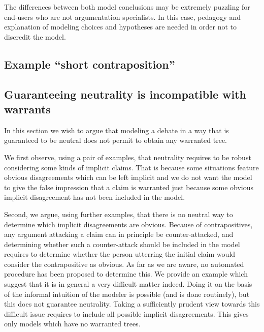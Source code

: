 \documentclass[version=3.21, pagesize, twoside=off, bibliography=totoc, DIV=calc, fontsize=12pt, a4paper, french, english]{scrartcl}
\begin{document}
The differences between both model conclusions may be extremely puzzling for end-users who are not argumentation specialists. In this case, pedagogy and explanation of modeling choices and hypotheses are needed in order not to discredit the model.

\subsection{Example “short contraposition”}

\subsection{Guaranteeing neutrality is incompatible with warrants}
In this section we wish to argue that modeling a debate in a way that is guaranteed to be neutral does not permit to obtain any warranted tree. 

We first observe, using a pair of examples, that neutrality requires to be robust considering some kinds of implicit claims. That is because some situations feature obvious disagreements which can be left implicit and we do not want the model to give the false impression that a claim is warranted just because some obvious implicit disagreement has not been included in the model.

Second, we argue, using further examples, that there is no neutral way to determine which implicit disagreements are obvious. Because of contrapositives, any argument attacking a claim can in principle be counter-attacked, and determining whether such a counter-attack should be included in the model requires to determine whether the person utterring the initial claim would consider the contrapositive as obvious. As far as we are aware, no automated procedure has been proposed to determine this. We provide an example which suggest that it is in general a very difficult matter indeed. Doing it on the basis of the informal intuition of the modeler is possible (and is done routinely), but this does not guarantee neutrality. Taking a sufficiently prudent view towards this difficult issue requires to include all possible implicit disagreements. This gives only models which have no warranted trees.
\end{document}
